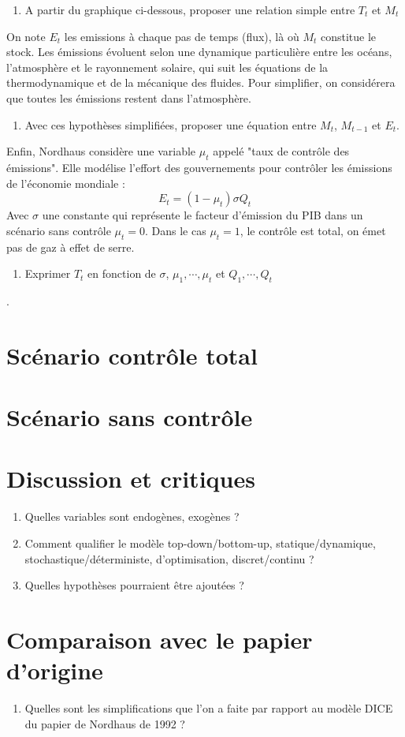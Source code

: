 \documentclass[12pt]{article}
\newcommand{\ques}[1]{\begin{enumerate}[resume]
\item  #1
\end{enumerate}}
\newcommand{\rep}[1]{\textit{Réponse :} #1 }
\renewcommand{\rep}[1]{ }
\theoremstyle{remark}
\begin{document}
\ques{A partir du graphique ci-dessous, proposer une relation simple entre $T_t$ et $M_t$}
\rep{\begin{equation*} T_t= \frac{M_t}{2000}\end{equation*}}

On note $E_t$ les emissions à chaque pas de temps (flux), là où $M_t$ constitue le stock.
Les émissions évoluent selon une dynamique particulière entre les océans, l'atmosphère et le rayonnement solaire, qui suit les équations de la thermodynamique et de la mécanique des fluides.
Pour simplifier, on considérera que toutes les émissions restent dans l'atmosphère.
\ques{ Avec ces hypothèses simplifiées, proposer une équation entre $M_t$, $M_{t-1}$ et $E_t$.}
\rep{$M_t =M_{t-1} +E_t$}

Enfin, Nordhaus considère une variable $\mu_t$ appelé "taux de contrôle des émissions".
Elle modélise l'effort des gouvernements pour contrôler les émissions de l'économie mondiale :
\begin{equation*}
E_t=(1-\mu_t)\sigma Q_t
\end{equation*}
Avec $\sigma$ une constante qui représente le facteur d'émission du PIB dans un scénario sans contrôle $\mu_t=0$. Dans le cas $\mu_t=1$, le contrôle est total, on émet pas de gaz à effet de serre.
\ques{Exprimer $T_t$ en fonction de $\sigma$, $\mu_1, \cdots, \mu_t$ et $Q_1, \cdots ,Q_t$}.
\rep{\begin{equation*}T_t= \frac{\sigma}{2000} \sum_{k=1}^t (1-\mu_k) Q_k  \end{equation*}}

\section{Scénario contrôle total}


\section{Scénario sans contrôle}


\section{Discussion et critiques}
\begin{enumerate}[resume]
\item Quelles variables sont endogènes, exogènes ?
\item Comment qualifier le modèle top-down/bottom-up, statique/dynamique, stochastique/déterministe, d'optimisation, discret/continu ?
\item Quelles hypothèses pourraient être ajoutées ?
\end{enumerate}

\section{Comparaison avec le papier d'origine}
\begin{enumerate}[resume]
\item Quelles sont les simplifications que l'on a faite par rapport au modèle DICE du papier de Nordhaus de 1992 ?
\end{enumerate}
\end{document}
